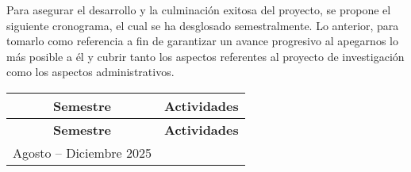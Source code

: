 Para asegurar el desarrollo y la culminación exitosa del proyecto, se propone el siguiente cronograma, el cual se ha desglosado semestralmente. Lo anterior, para tomarlo como referencia a fin de garantizar un avance progresivo al apegarnos lo más posible a él y cubrir tanto los aspectos referentes al proyecto de investigación como los aspectos administrativos.\\

\begin{longtable}{|c|p{}|} 
    \hline
    \textbf{Semestre} & \multicolumn{1}{c|}{\textbf{Actividades}} \\ 
    \hline
    \endfirsthead

    \hline
    \textbf{Semestre} & \multicolumn{1}{c|}{\textbf{Actividades}} \\ 
    \hline
    \endhead
    
    \centering Agosto -- Diciembre 2025 & 
    

\end{longtable}
